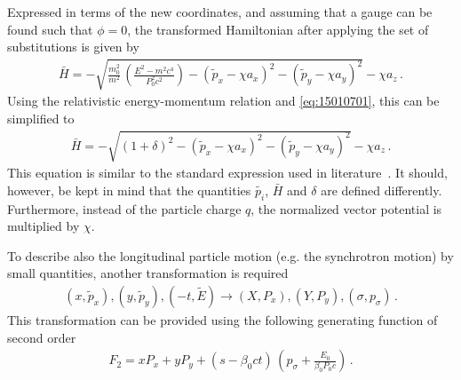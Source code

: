 Expressed in terms of the new coordinates, and assuming that a gauge can be found such that $\phi=0$, the transformed Hamiltonian after applying the set of substitutions is given by
%
\begin{align}
\bar{H} = - \sqrt{ \frac{m_0^2}{m^2} \, \left( \frac{E^2 - m^2 c^4}{P_0^2c^2} \right)   - (\tilde{p}_x - \chi a_x)^2 - (\tilde{p}_y- \chi a_y)^2   } - \chi a_z \, .
\end{align}
% 
Using the relativistic energy-momentum relation and \eqref{eq:15010701}, this can be simplified to
\begin{align}
\bar{H} = - \sqrt{(1+\delta)^2  - (\tilde{p}_x - \chi a_x)^2 - (\tilde{p}_y-\chi a_y)^2 } - \chi a_z \, .
\end{align}
%
This equation is similar to the standard expression used in literature~\cite{DESY-85-084}. It should, however, be kept in mind that the quantities $\tilde{p_i}$, $\bar{H}$ and $\delta$ are defined differently. Furthermore, instead of the particle charge $q$, the normalized vector potential is multiplied by $\chi$. 

To describe also the longitudinal particle motion (e.g. the synchrotron motion) by small quantities, another transformation is required
%
\begin{align}
(x,\tilde{p}_x), (y,\tilde{p}_y), (-t,\tilde{E}) \rightarrow (X,P_x), (Y,P_y), (\sigma,p_\sigma) \, .
\end{align}
%
This transformation can be provided using the following generating function of second order
\begin{align}
F_2 = x P_x + y P_y + (s-\beta_0 ct) \, \left( p_\sigma + \frac{E_0}{\beta_0 P_0 c} \right) \, .
\end{align}
%

